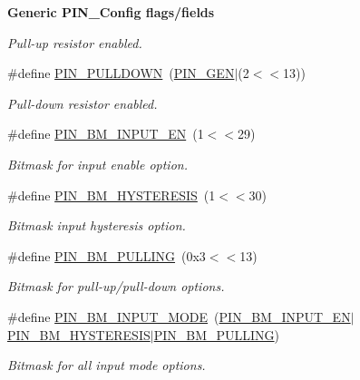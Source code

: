 \begin{Indent}{\bf Generic P\+I\+N\+\_\+\+Config flags/fields}
\begin{DoxyCompactItemize}
\begin{DoxyCompactList}\small\item\em Pull-\/up resistor enabled. \end{DoxyCompactList}\item 
\#define \hyperlink{_p_i_n_8h_a12b3efd67d32926ca0c310f95396de43}{P\+I\+N\+\_\+\+P\+U\+L\+L\+D\+O\+W\+N}~(\hyperlink{_p_i_n_8h_ae1f7e47a17caab9697e69e5b9aff270b}{P\+I\+N\+\_\+\+G\+E\+N}$\vert$(2$<$$<$13))
\begin{DoxyCompactList}\small\item\em Pull-\/down resistor enabled. \end{DoxyCompactList}\item 
\#define \hyperlink{_p_i_n_8h_aa0ed7bdcf3409fb2e8d2553bfa26ef35}{P\+I\+N\+\_\+\+B\+M\+\_\+\+I\+N\+P\+U\+T\+\_\+\+E\+N}~(1$<$$<$29)
\begin{DoxyCompactList}\small\item\em Bitmask for input enable option. \end{DoxyCompactList}\item 
\#define \hyperlink{_p_i_n_8h_a90670b834483d4047070f5f310998f29}{P\+I\+N\+\_\+\+B\+M\+\_\+\+H\+Y\+S\+T\+E\+R\+E\+S\+I\+S}~(1$<$$<$30)
\begin{DoxyCompactList}\small\item\em Bitmask input hysteresis option. \end{DoxyCompactList}\item 
\#define \hyperlink{_p_i_n_8h_a4f6a52f4c21a5ae30926e4d595ee9837}{P\+I\+N\+\_\+\+B\+M\+\_\+\+P\+U\+L\+L\+I\+N\+G}~(0x3$<$$<$13)
\begin{DoxyCompactList}\small\item\em Bitmask for pull-\/up/pull-\/down options. \end{DoxyCompactList}\item 
\#define \hyperlink{_p_i_n_8h_a3fe41a9595912571c21f68fa9d9585bb}{P\+I\+N\+\_\+\+B\+M\+\_\+\+I\+N\+P\+U\+T\+\_\+\+M\+O\+D\+E}~(\hyperlink{_p_i_n_8h_aa0ed7bdcf3409fb2e8d2553bfa26ef35}{P\+I\+N\+\_\+\+B\+M\+\_\+\+I\+N\+P\+U\+T\+\_\+\+E\+N}$\vert$\hyperlink{_p_i_n_8h_a90670b834483d4047070f5f310998f29}{P\+I\+N\+\_\+\+B\+M\+\_\+\+H\+Y\+S\+T\+E\+R\+E\+S\+I\+S}$\vert$\hyperlink{_p_i_n_8h_a4f6a52f4c21a5ae30926e4d595ee9837}{P\+I\+N\+\_\+\+B\+M\+\_\+\+P\+U\+L\+L\+I\+N\+G})
\begin{DoxyCompactList}\small\item\em Bitmask for all input mode options. \end{DoxyCompactList}\item 

\end{DoxyCompactItemize}
\end{Indent}
